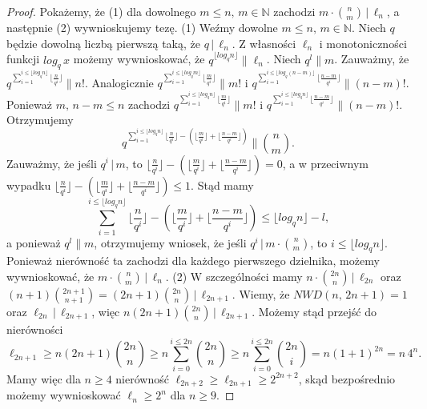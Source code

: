 \documentclass[declaration,shortabstract]{iithesis}
\theoremstyle{definition}
\theoremstyle{remark} \newtheorem{observation}{Obserwacja}
\theoremstyle{plain} \newtheorem{theorem}{Twierdzenie}
\theoremstyle{plain} \newtheorem{lemma}{Lemat}
\theoremstyle{remark} \newtheorem*{remark*}{Uwaga}
\theoremstyle{reminder} \newtheorem*{reminder*}{Przypomnienie}
\begin{document}
\begin{proof}
	Pokażemy, że (1) dla dowolnego $m \leq n, \, m \in \mathbb{N}$ zachodzi $m \cdot {n \choose m} \, | \, \ell_n$, a następnie (2) wywnioskujemy tezę. \newline 
	(1) Weźmy dowolne $m \leq n, \, m \in \mathbb{N}$. Niech $q$ będzie dowolną liczbą pierwszą taką, że $q \, | \, \ell_n$. Z własności $\ell_n$ i monotoniczności funkcji $log_q\, x$ możemy wywnioskować, że $q^{\lfloor log_q n \rfloor} \parallel \ell_n$. Niech $q^l \parallel m$. Zauważmy, że $q^{\sum_{i=1}^{i \leq \lfloor log_q n \rfloor} \lfloor \frac{n}{q^i}\rfloor} \parallel n!$. Analogicznie $q^{\sum_{i=1}^{i \leq \lfloor log_q m \rfloor} \lfloor \frac{m}{q^i}\rfloor} \parallel m!$ i $q^{\sum_{i=1}^{i \leq \lfloor log_q (n-m) \rfloor} \lfloor \frac{n-m}{q^i}\rfloor} \parallel (n-m)!$. Ponieważ $m, \, n - m \leq n$ zachodzi $q^{\sum_{i=1}^{i \leq \lfloor log_q n \rfloor} \lfloor \frac{m}{q^i}\rfloor} \parallel m!$ i $q^{\sum_{i=1}^{i \leq \lfloor log_q n \rfloor} \lfloor \frac{n-m}{q^i}\rfloor} \parallel (n-m)!$. 
	Otrzymujemy \[q^{\sum_{i=1}^{i \leq \lfloor log_q n \rfloor} \lfloor \frac{n}{q^i}\rfloor - (\lfloor \frac{m}{q^i}\rfloor + \lfloor \frac{n-m}{q^i}\rfloor)} \parallel {n \choose m}.\]    
	Zauważmy, że jeśli $q^i \, | \, m$, to $\lfloor \frac{n}{q^i}\rfloor - (\lfloor \frac{m}{q^i}\rfloor + \lfloor \frac{n-m}{q^i}\rfloor) = 0$, a w przeciwnym wypadku $\lfloor \frac{n}{q^i}\rfloor - (\lfloor \frac{m}{q^i}\rfloor + \lfloor \frac{n-m}{q^i}\rfloor) \leq 1$. Stąd mamy \[\sum_{i=1}^{i \leq \lfloor log_qn \rfloor} \lfloor \frac{n}{q^i}\rfloor - (\lfloor \frac{m}{q^i}\rfloor + \lfloor \frac{n-m}{q^i}\rfloor) \leq \lfloor log_qn \rfloor - l,\] a ponieważ $q^l \parallel m$, otrzymujemy wniosek, że jeśli $q^i \, | \, m \cdot {n \choose m}$, to $i \leq \lfloor log_qn \rfloor$. Ponieważ nierówność ta zachodzi dla każdego pierwszego dzielnika, możemy wywnioskować, że $m \cdot {n \choose m} \, | \, \ell_n$.\newline
	(2) W szczególności mamy $n \cdot {2n \choose n} \, | \, \ell_{2n}$ oraz $(n+1){2n + 1 \choose n + 1} = (2n + 1){2n \choose n}\, |\, \ell_{2n+1}$. Wiemy, że $NWD(n,\, 2n + 1) = 1$ oraz $\ell_{2n} \, | \, \ell_{2n + 1}$, więc $n(2n + 1){2n \choose n}\, |\, \ell_{2n + 1}$. Możemy stąd przejść do nierówności \[\ell_{2n + 1} \geq n(2n + 1){2n \choose n} \geq n \sum_{i=0}^{i \leq 2n}{2n \choose n} \geq n {\sum_{i=0}^{i \leq 2n}{2n \choose i}} = n(1 + 1)^{2n} = n \, 4^n.\]
	Mamy więc dla $n \geq 4$ nierówność $\ell_{2n+2} \geq \ell_{2n+1} \geq 2^{2n + 2}$, skąd bezpośrednio możemy wywnioskować $\ell_n \geq 2^n$ dla $n \geq 9$.
					
\end{proof}
	
\end{document}
